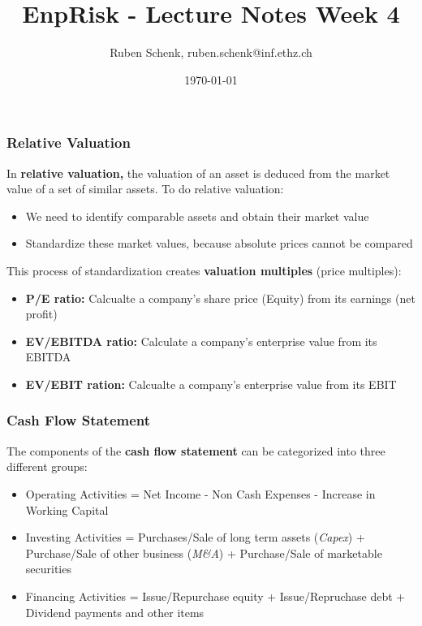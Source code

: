 \documentclass[a4paper]{extarticle}
\title{EnpRisk - Lecture Notes Week 4}
\author{Ruben Schenk, ruben.schenk@inf.ethz.ch}
\date{\today}
\begin{document}
\maketitle
\newpage

\subsubsection{Relative Valuation}

In \textbf{relative valuation,} the valuation of an asset is deduced from the market value of a set of similar assets. To do relative valuation:

\begin{itemize}
    \item We need to identify comparable assets and obtain their market value
    \item Standardize these market values, because absolute prices cannot be compared
\end{itemize}

This process of standardization creates \textbf{valuation multiples} (price multiples):

\begin{itemize}
    \item \textbf{P/E ratio:} Calcualte a company's share price (Equity) from its earnings (net profit)
    \item \textbf{EV/EBITDA ratio:} Calculate a company's enterprise value from its EBITDA
    \item \textbf{EV/EBIT ration:} Calcualte a company's enterprise value from its EBIT
\end{itemize}

\subsubsection{Cash Flow Statement}

The components of the \textbf{cash flow statement} can be categorized into three different groups:

\begin{itemize}
    \item Operating Activities = Net Income - Non Cash Expenses - Increase in Working Capital
    \item Investing Activities = Purchases/Sale of long term assets (\textit{Capex}) + Purchase/Sale of other business (\textit{M\&A}) + Purchase/Sale of marketable securities
    \item Financing Activities = Issue/Repurchase equity + Issue/Repruchase debt + Dividend payments and other items
\end{itemize}
\end{document}
